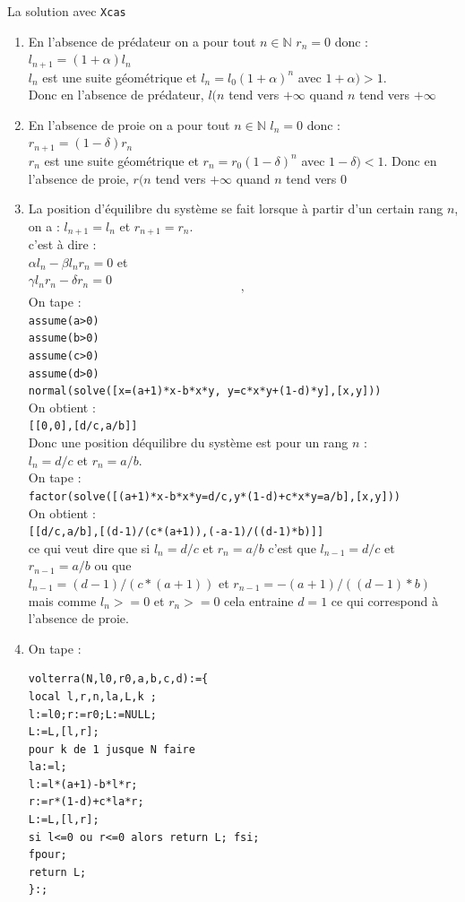 \documentclass[a4paper,11pt]{book}
\newcommand{\N}{{\mathbb{N}}}
\begin{document}
La solution avec {\tt Xcas}
\begin{enumerate}
\item  En l’absence de pr\'edateur on a pour tout $n \in \N$ $r_n=0$ donc :\\
$l_{ n+1} =(1+ \alpha) l_n$ \\
$l_n$ est une suite g\'eom\'etrique et $l_n=l_0(1+ \alpha)^n$ avec  $1+ \alpha)>1$.\\
Donc  en l’absence de pr\'edateur, $l(n$ tend vers $+\infty$ quand $n$ tend vers $+\infty$
\item  En l’absence de proie on a pour tout $n \in \N$ $l_n=0$ donc :\\
$r_{ n+1} =(1- \delta) r_n$ \\
$r_n$ est une suite g\'eom\'etrique et $r_n=r_0(1- \delta)^n$ avec  $1- \delta)<1$.
Donc en l’absence de proie, $r(n$ tend vers $+\infty$ quand $n$ tend vers $0$
\item  La position d’\'equilibre du syst\`eme se fait lorsque \`a partir d'un
certain rang $n$, on a : $l_{ n+1} = l_n$ et $r_{ n+1} =r_n$.\\
c'est \`a dire :\\
$\alpha l_n - \beta l_n r_n =0$ et\\
$\gamma l_{ n} r_{ n} - \delta r_{ n}=0$
$$, $$
On tape :\\
{\tt assume(a>0)}\\
{\tt assume(b>0)}\\
{\tt assume(c>0)}\\
{\tt assume(d>0)}\\
{\tt normal(solve([x=(a+1)*x-b*x*y, y=c*x*y+(1-d)*y],[x,y]))}\\
On obtient :\\
{\tt [[0,0],[d/c,a/b]]}\\
Donc une position d\'equilibre du syst\`eme est pour un rang $n$ :\\
$l_n=d/c$ et $r_n=a/b$.\\
On tape :\\
{\tt factor(solve([(a+1)*x-b*x*y=d/c,y*(1-d)+c*x*y=a/b],[x,y]))}\\
On obtient :\\
{\tt [[d/c,a/b],[(d-1)/(c*(a+1)),(-a-1)/((d-1)*b)]]}\\
ce qui veut dire que si $l_n=d/c$ et $r_n=a/b$ c'est que 
$l_{n-1}=d/c$ et $r_{n-1}=a/b$ ou que \\
$l_{n-1}=(d-1)/(c*(a+1))$ et $r_{n-1}=-(a+1)/((d-1)*b)$ 
mais comme $l_n>=0$ et $r_n>=0$ cela entraine $d=1$ ce qui correspond \`a 
l'absence de proie.
\item  On tape :
\begin{verbatim}
volterra(N,l0,r0,a,b,c,d):={
local l,r,n,la,L,k ;
l:=l0;r:=r0;L:=NULL;
L:=L,[l,r];  
pour k de 1 jusque N faire
la:=l;
l:=l*(a+1)-b*l*r;
r:=r*(1-d)+c*la*r;
L:=L,[l,r];  
si l<=0 ou r<=0 alors return L; fsi;
fpour;
return L;
}:;
\end{verbatim}

\end{enumerate}
\end{document}
